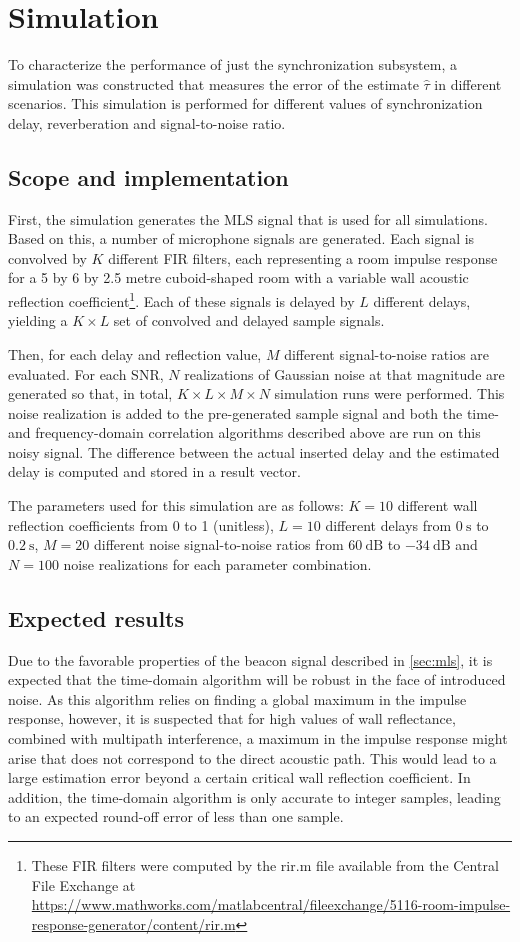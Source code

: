 \documentclass[a4paper, notitlepage]{report}
\begin{document}
\section{Simulation}
\label{sec:sync-simulation}
To characterize the performance of just the synchronization subsystem, a simulation was constructed that measures the error of the estimate $\hat{\tau}$ in different scenarios. This simulation is performed for different values of synchronization delay, reverberation and signal-to-noise ratio.

\subsection{Scope and implementation}
First, the simulation generates the MLS signal that is used for all simulations. Based on this, a number of microphone signals are generated. Each signal is convolved by $K$ different FIR filters, each representing a room impulse response for a 5 by 6 by 2.5 metre cuboid-shaped room with a variable wall acoustic reflection coefficient\footnote{These FIR filters were computed by the rir.m file available from the \matlab Central File Exchange at \url{https://www.mathworks.com/matlabcentral/fileexchange/5116-room-impulse-response-generator/content/rir.m}}. Each of these signals is delayed by $L$ different delays, yielding a $K \times L$ set of convolved and delayed sample signals.

Then, for each delay and reflection value, $M$ different signal-to-noise ratios are evaluated. For each SNR, $N$ realizations of Gaussian noise at that magnitude are generated so that, in total, $K \times L \times M \times N$ simulation runs were performed. This noise realization is added to the pre-generated sample signal and both the time- and frequency-domain correlation algorithms described above are run on this noisy signal. The difference between the actual inserted delay and the estimated delay is computed and stored in a result vector.

The parameters used for this simulation are as follows: $K = 10$ different wall reflection coefficients from 0 to 1 (unitless), $L = 10$ different delays from $0~\mathrm{s}$ to $0.2~\mathrm{s}$, $M = 20$ different noise signal-to-noise ratios from $60~\mathrm{dB}$ to $-34~\mathrm{dB}$ and $N = 100$ noise realizations for each parameter combination.

\subsection{Expected results}
Due to the favorable properties of the beacon signal described in \ref{sec:mls}, it is expected that the time-domain algorithm will be robust in the face of introduced noise. As this algorithm relies on finding a global maximum in the impulse response, however, it is suspected that for high values of wall reflectance, combined with multipath interference, a maximum in the impulse response might arise that does not correspond to the direct acoustic path. This would lead to a large estimation error beyond a certain critical wall reflection coefficient. In addition, the time-domain algorithm is only accurate to integer samples, leading to an expected round-off error of less than one sample.
\end{document}
